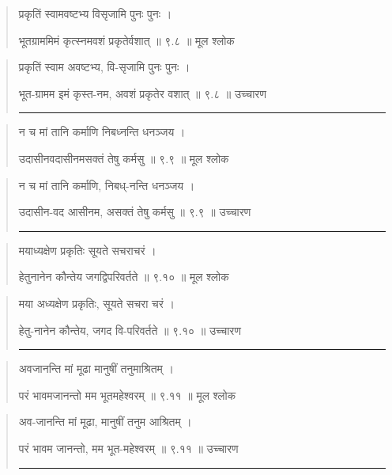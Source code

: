 \begin{quotation} 

प्रकृतिं स्वामवष्टभ्य विसृजामि पुनः पुनः  ।  

भूतग्राममिमं कृत्स्नमवशं प्रकृतेर्वशात्‌  ॥ ९.८ ॥  मूल श्लोक
\end{quotation}

\begin{quotation}

प्रकृतिं स्वाम अवष्टभ्य, वि-सृजामि पुनः पुनः  ।  

भूत-ग्रामम इमं कृस्त-नम, अवशं प्रकृतेर वशात्‌  ॥ ९.८ ॥  उच्चारण

\noindent\rule{16cm}{0.4pt} 
\end{quotation}


\begin{quotation} 

न च मां तानि कर्माणि निबध्नन्ति धनञ्जय ।  

उदासीनवदासीनमसक्तं तेषु कर्मसु  ॥ ९.९ ॥  मूल श्लोक
\end{quotation}

\begin{quotation}

न च मां तानि कर्माणि, निबध्-नन्ति धनञ्जय ।  

उदासीन-वद आसीनम, असक्तं तेषु कर्मसु  ॥ ९.९ ॥  उच्चारण

\noindent\rule{16cm}{0.4pt} 
\end{quotation}


\begin{quotation} 

मयाध्यक्षेण प्रकृतिः सूयते सचराचरं  ।  

हेतुनानेन कौन्तेय जगद्विपरिवर्तते  ॥ ९.१० ॥  मूल श्लोक
\end{quotation}

\begin{quotation}

मया अध्यक्षेण प्रकृतिः, सूयते सचरा चरं  ।  

हेतु-नानेन कौन्तेय, जगद वि-परिवर्तते  ॥ ९.१० ॥  उच्चारण

\noindent\rule{16cm}{0.4pt} 
\end{quotation}


\begin{quotation} 

अवजानन्ति मां मूढा मानुषीं तनुमाश्रितम्‌ ।  

परं भावमजानन्तो मम भूतमहेश्वरम्‌  ॥ ९.११ ॥  मूल श्लोक
\end{quotation}

\begin{quotation}

अव-जानन्ति मां मूढा, मानुषीं तनुम आश्रितम्‌ ।  

परं भावम जानन्तो, मम भूत-महेश्वरम्‌  ॥ ९.११ ॥  उच्चारण

\noindent\rule{16cm}{0.4pt} 
\end{quotation}


